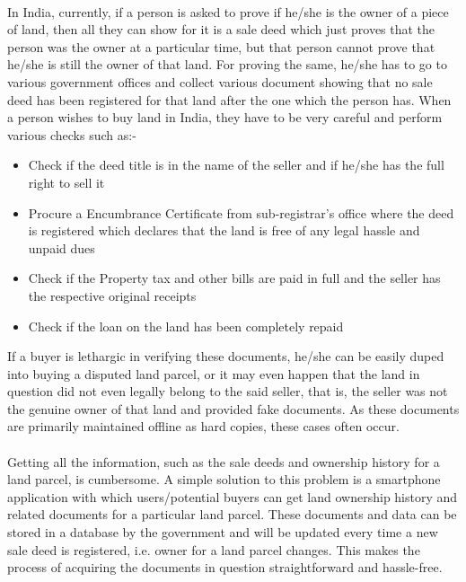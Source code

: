 \documentclass[12pt]{article}
\begin{document}
        \paragraph{}
        In India, currently, if a person is asked to prove if he/she is the owner of a piece of land, then all they can show for it is a sale deed which just proves that the person was the owner at a particular time, but that person cannot prove that he/she is still the owner of that land. For proving the same, he/she has to go to various government offices and collect various document showing that no sale deed has been registered for that land after the one which the person has. When a person wishes to buy land in India, they have to be very careful and perform various checks such as:-
        \begin{itemize}
            \item Check if the deed title is in the name of the seller and if he/she has the full right to sell it
            \item Procure a Encumbrance Certificate from sub-registrar's office where the deed is registered which declares that the land is free of any legal hassle and unpaid dues
            \item Check if the Property tax and other bills are paid in full and the seller has the respective original receipts
            \item Check if the loan on the land has been completely repaid
        \end{itemize}
        If a buyer is lethargic in verifying these documents, he/she can be easily duped into buying a disputed land parcel, or it may even happen that the land in question did not even legally belong to the said seller, that is, the seller was not the genuine owner of that land and provided fake documents. As these documents are primarily maintained offline as hard copies, these cases often occur.

        \paragraph{}
        Getting all the information, such as the sale deeds and ownership history for a land parcel, is cumbersome. A simple solution to this problem is a smartphone application with which users/potential buyers can get land ownership history and related documents for a particular land parcel. These documents and data can be stored in a database by the government and will be updated every time a new sale deed is registered, i.e. owner for a land parcel changes. This makes the process of acquiring the documents in question straightforward and hassle-free.
\end{document}
